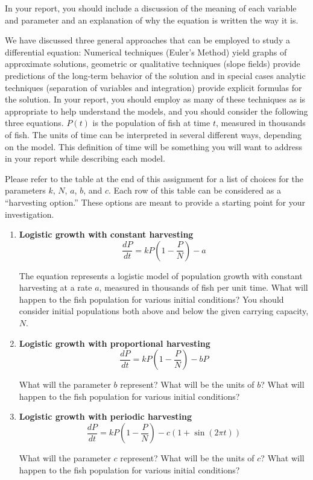 \documentclass
[justified,nohyper]
{tufte-handout}
\begin{document}
In your 
report, you should include a discussion of the meaning of each variable and parameter and an 
explanation of why the equation is written the way it is.

We have discussed three general approaches that can be employed to study a differential equation: 
Numerical techniques (Euler's Method) yield graphs of approximate solutions, 
geometric or qualitative techniques (slope fields) provide 
predictions of the long-term behavior of the solution and in special cases analytic techniques
(separation of variables and integration) provide 
explicit formulas for the solution. In your report, you should employ as many of these
techniques as is 
appropriate to help understand the models, and you should consider the following three equations.
$P(t)$ is the population of fish at time $t$, measured in thousands of fish. The units of time
can be interpreted in several different ways, depending on the model. This definition of time
will be something you will want to address in your report while describing each model.

Please refer to the table at the end of this assignment for a list of choices for the parameters $k$, 
$N$, $a$, $b$, and $c$. Each row of this table can be considered as a ``harvesting option.'' These
options are meant to provide a starting point for your investigation.

\begin{enumerate}
    \item \textbf{Logistic growth with constant harvesting}
    \[
        \displaystyle\frac{dP}{dt}=kP\left(1-\displaystyle\frac{P}{N}\right) - a
    \]

The equation represents a logistic model of population growth with constant harvesting at 
a rate $a$, measured in thousands of fish per unit time. 
What will happen to the fish population for various initial conditions? You should consider
initial populations both above and below the given carrying capacity, $N$.

    \item \textbf{Logistic growth with proportional harvesting}
    \[
        \displaystyle\frac{dP}{dt}= kP\left(1-\displaystyle\frac{P}{N}\right)
            - bP
    \]

What will
the parameter $b$ represent? What will be the units of $b$? What will happen to the
fish population for various initial conditions?

    \item \textbf{Logistic growth with periodic harvesting}
    \[
        \displaystyle\frac{dP}{dt}= kP\left(1-\displaystyle\frac{P}{N}\right)
            - c\left(1+\sin\left(2\pi t\right)\right)
    \]

What will
the parameter $c$ represent? What will be the units of $c$? What will happen to the
fish population for various initial conditions?

\end{enumerate}
\end{document}
